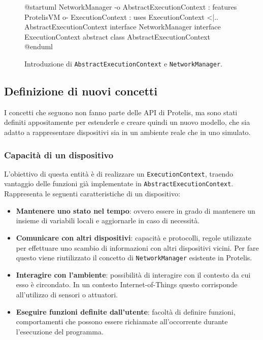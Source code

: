 \begin{figure}
  \centering
    \begin{plantuml}
      @startuml
      NetworkManager -o AbstractExecutionContext : features
      ProtelisVM o- ExecutionContext : uses
      ExecutionContext <|.. AbstractExecutionContext
      interface NetworkManager
      interface ExecutionContext
      abstract class AbstractExecutionContext
      @enduml
    \end{plantuml}
    \caption{Introduzione di \texttt{AbstractExecutionContext} e \texttt{NetworkManager}.}
  \label{fig:uml-networkmanager}
\end{figure}

\subsection{Definizione di nuovi concetti}
I concetti che seguono non fanno parte delle API di Protelis, ma sono stati
definiti appositamente per estenderle e creare quindi un nuovo modello, che sia
adatto a rappresentare dispositivi sia in un ambiente reale che in uno simulato.

\subsubsection{Capacità di un dispositivo}
L'obiettivo di questa entità è di realizzare un \texttt{ExecutionContext},
traendo vantaggio delle funzioni già implementate in
\texttt{AbstractExecutionContext}. Rappresenta le seguenti caratteristiche di un
dispositivo:
\begin{itemize}
\item \textbf{Mantenere uno stato nel tempo}: ovvero essere in grado di
  mantenere un insieme di variabili locali e aggiornarle in caso di necessità.
\item \textbf{Comunicare con altri dispositivi}: capacità e protocolli, regole
  utilizzate per effettuare uno scambio di informazioni con altri dispositivi
  vicini. Per fare questo viene riutilizzato il concetto di
  \texttt{NetworkManager} esistente in Protelis.
\item \textbf{Interagire con l'ambiente}: possibilità di interagire con il
  contesto da cui esso è circondato. In un contesto Internet-of-Things questo
  corrisponde all'utilizzo di sensori o attuatori.
\item \textbf{Eseguire funzioni definite dall'utente}: facoltà di definire
  funzioni, comportamenti che possono essere richiamate all'occorrente durante
  l'esecuzione del programma.
\end{itemize}

